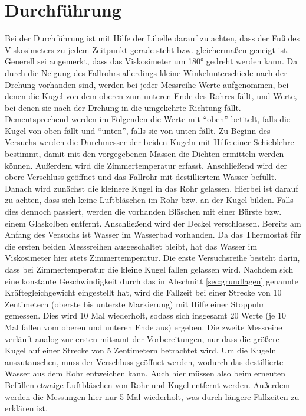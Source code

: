 \section{Durchführung}
Bei der Durchführung ist mit Hilfe der Libelle darauf zu achten, dass der Fuß des Viskosimeters zu jedem Zeitpunkt gerade steht
bzw. gleichermaßen geneigt ist.
Generell sei angemerkt, dass das Viskosimeter um 180° gedreht werden kann. 
Da durch die Neigung des Fallrohrs allerdings kleine Winkelunterschiede nach der Drehung vorhanden sind, werden bei jeder Messreihe Werte aufgenommen,
bei denen die Kugel von dem oberen zum unteren Ende des Rohres fällt, und Werte, bei denen sie nach der Drehung in die umgekehrte Richtung fällt.
Dementsprechend werden im Folgenden die Werte mit \enquote{oben} betitelt, falls die Kugel von oben fällt und \enquote{unten}, falls sie von unten fällt.
Zu Beginn des Versuchs werden die Durchmesser der beiden Kugeln mit Hilfe einer Schieblehre bestimmt,
damit mit den vorgegebenen Massen die Dichten ermitteln werden können.
Außerdem wird die Zimmertemperatur erfasst.
Anschließend wird der obere Verschluss geöffnet und das Fallrohr mit destilliertem Wasser befüllt. 
Danach wird zunächst die kleinere Kugel in das Rohr gelassen.
Hierbei ist darauf zu achten, dass sich keine Luftbläschen im Rohr bzw. an der Kugel bilden.
Falls dies dennoch passiert, werden die vorhanden Bläschen mit einer Bürste bzw. einem Glaskolben entfernt.
Anschließend wird der Deckel verschlossen.
Bereits am Anfang des Versuchs ist Wasser im Wasserbad vorhanden. 
Da das Thermostat für die ersten beiden Messsreihen ausgeschaltet bleibt, hat das Wasser im Viskosimeter hier stets Zimmertemperatur.
%
Die erste Versuchsreihe besteht darin, dass bei Zimmertemperatur die kleine Kugel fallen gelassen wird.
Nachdem sich eine konstante Geschwindigkeit durch das in Abschnitt \ref{sec:grundlagen} genannte Kräftegleichgewicht eingestellt hat,
wird die Fallzeit bei einer Strecke von 10 Zentimetern (oberste bis unterste Markierung)
mit Hilfe einer Stoppuhr gemessen.
Dies wird 10 Mal wiederholt, sodass sich insgesamt 20 Werte (je 10 Mal fallen vom oberen und unteren Ende aus) ergeben.
%
Die zweite Messreihe verläuft analog zur ersten mitsamt der Vorbereitungen, nur dass die größere Kugel auf einer Strecke von 5 Zentimetern betrachtet wird.
Um die Kugeln auszutauschen, muss der Verschluss geöffnet werden, wodurch das destillierte Wasser aus dem Rohr entweichen kann.
Auch hier müssen also beim erneuten Befüllen etwaige Luftbläschen von Rohr und Kugel entfernt werden.
Außerdem werden die Messungen hier nur 5 Mal wiederholt, was durch längere Fallzeiten zu erklären ist.
